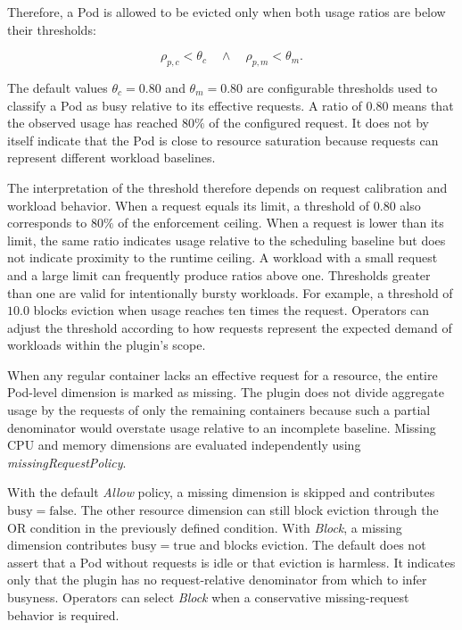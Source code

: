 Therefore, a Pod is allowed to be evicted only when both usage ratios are below their thresholds:

\[
    \rho_{p,c} < \theta_c
    \quad \land \quad
    \rho_{p,m} < \theta_m.
\]

The default values \(\theta_c = 0.80\) and \(\theta_m = 0.80\) are configurable thresholds used to classify a Pod as busy relative to its effective requests. A ratio of \(0.80\) means that the observed usage has reached \(80\%\) of the configured request. It does not by itself indicate that the Pod is close to resource saturation because requests can represent different workload baselines.

The interpretation of the threshold therefore depends on request calibration and workload behavior. When a request equals its limit, a threshold of \(0.80\) also corresponds to \(80\%\) of the enforcement ceiling. When a request is lower than its limit, the same ratio indicates usage relative to the scheduling baseline but does not indicate proximity to the runtime ceiling. A workload with a small request and a large limit can frequently produce ratios above one. Thresholds greater than one are valid for intentionally bursty workloads. For example, a threshold of \(10.0\) blocks eviction when usage reaches ten times the request. Operators can adjust the threshold according to how requests represent the expected demand of workloads within the plugin's scope.

When any regular container lacks an effective request for a resource, the entire Pod-level dimension is marked as missing. The plugin does not divide aggregate usage by the requests of only the remaining containers because such a partial denominator would overstate usage relative to an incomplete baseline. Missing CPU and memory dimensions are evaluated independently using \textit{missingRequestPolicy}.

With the default \textit{Allow} policy, a missing dimension is skipped and contributes \(\mathrm{busy}=\mathrm{false}\). The other resource dimension can still block eviction through the OR condition in the previously defined condition. With \textit{Block}, a missing dimension contributes \(\mathrm{busy}=\mathrm{true}\) and blocks eviction. The default does not assert that a Pod without requests is idle or that eviction is harmless. It indicates only that the plugin has no request-relative denominator from which to infer busyness. Operators can select \textit{Block} when a conservative missing-request behavior is required.

